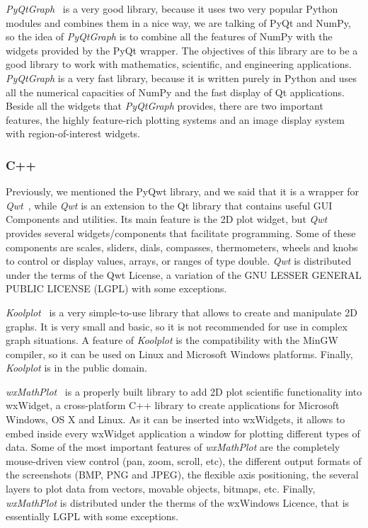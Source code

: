 
\emph{PyQtGraph}~\cite{PyQtGraph} is a very good library, because it uses two very popular Python modules and combines them in a nice way, we are talking of PyQt and NumPy,
so the idea of \emph{PyQtGraph} is to combine all the features of NumPy with the widgets provided by the PyQt wrapper.
The objectives of this library are to be a good library to work with mathematics, scientific, and engineering applications.
\emph{PyQtGraph} is a very fast library, because it is written purely in Python and uses all the numerical capacities of NumPy and the fast display
of Qt applications.
Beside all the widgets that \emph{PyQtGraph} provides, there are two important features, the highly feature-rich plotting systems and an image display system
with region-of-interest widgets.


\subsubsection{C++}
Previously, we mentioned the PyQwt library, and we said that it is a wrapper for \emph{Qwt}~\cite{Qwt}, while \emph{Qwt} is an extension to the Qt library that
contains useful GUI Components and utilities.
Its main feature is the 2D plot widget, but \emph{Qwt} provides several widgets/components that facilitate programming.
Some of these components are scales, sliders, dials, compasses, thermometers, wheels and knobs to control or display values, arrays, or ranges of type double.
\emph{Qwt} is distributed under the terms of the Qwt License, a variation of the GNU LESSER GENERAL PUBLIC LICENSE (LGPL) with some exceptions.


\emph{Koolplot}~\cite{Koolplot} is a very simple-to-use library that allows to create and manipulate 2D graphs.
It is very small and basic, so it is not recommended for use in complex graph situations.
A feature of \emph{Koolplot} is the compatibility with the MinGW compiler, so it can be used on Linux and Microsoft Windows platforms.
Finally, \emph{Koolplot} is in the public domain.


\emph{wxMathPlot}~\cite{wxMathPlot} is a properly built library to add 2D plot scientific functionality into wxWidget, a cross-platform C++ library to create applications
for Microsoft Windows, OS X and Linux.
As it can be inserted into wxWidgets, it allows to embed inside every wxWidget application a window for plotting different types of data.
Some of the most important features of \emph{wxMathPlot} are the completely mouse-driven view control (pan, zoom, scroll, etc), the different output formats of
the screenshots (BMP, PNG and JPEG), the flexible axis positioning, the several layers to plot data from vectors, movable objects, bitmaps, etc.
Finally, \emph{wxMathPlot} is distributed under the therms of the wxWindows Licence, that is essentially LGPL with some exceptions.

